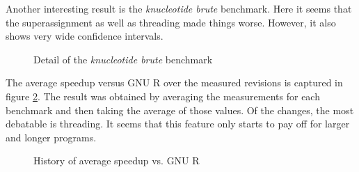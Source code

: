 Another interesting result is the \emph{knucleotide brute} benchmark. Here it seems that the superassignment as well as threading made things worse. However, it also shows very wide confidence intervals.


\begin{figure}[htbp]
  \caption{\label{fig:knucleotide}Detail of the \emph{knucleotide brute} benchmark}
  \centering
\end{figure}

The average speedup versus GNU R over the measured revisions is captured in figure \ref{fig:avg-speedup-history}. The result was obtained by averaging the measurements for each benchmark and then taking the average of those values. Of the changes, the most debatable is threading. It seems that this feature only starts to pay off for larger and longer programs.

\begin{figure}[htbp]
  \caption{\label{fig:avg-speedup-history}History of average speedup vs. GNU R}
  \centering
\end{figure}
